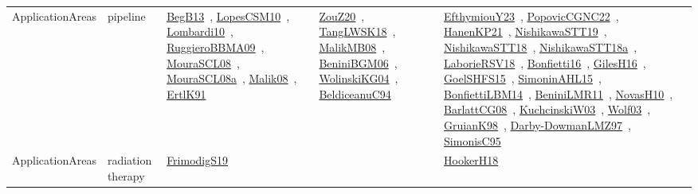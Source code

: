 {\begin{longtable}{lp{3cm}>{\raggedright\arraybackslash}p{6cm}>{\raggedright\arraybackslash}p{6cm}>{\raggedright\arraybackslash}p{8cm}}
ApplicationAreas & pipeline & \href{works/BegB13.pdf}{BegB13}~\cite{BegB13}, \href{works/LopesCSM10.pdf}{LopesCSM10}~\cite{LopesCSM10}, \href{works/Lombardi10.pdf}{Lombardi10}~\cite{Lombardi10}, \href{works/RuggieroBBMA09.pdf}{RuggieroBBMA09}~\cite{RuggieroBBMA09}, \href{works/MouraSCL08.pdf}{MouraSCL08}~\cite{MouraSCL08}, \href{works/MouraSCL08a.pdf}{MouraSCL08a}~\cite{MouraSCL08a}, \href{works/Malik08.pdf}{Malik08}~\cite{Malik08}, \href{works/ErtlK91.pdf}{ErtlK91}~\cite{ErtlK91} & \href{works/ZouZ20.pdf}{ZouZ20}~\cite{ZouZ20}, \href{works/TangLWSK18.pdf}{TangLWSK18}~\cite{TangLWSK18}, \href{works/MalikMB08.pdf}{MalikMB08}~\cite{MalikMB08}, \href{works/BeniniBGM06.pdf}{BeniniBGM06}~\cite{BeniniBGM06}, \href{works/WolinskiKG04.pdf}{WolinskiKG04}~\cite{WolinskiKG04}, \href{works/BeldiceanuC94.pdf}{BeldiceanuC94}~\cite{BeldiceanuC94} & \href{works/EfthymiouY23.pdf}{EfthymiouY23}~\cite{EfthymiouY23}, \href{works/PopovicCGNC22.pdf}{PopovicCGNC22}~\cite{PopovicCGNC22}, \href{works/HanenKP21.pdf}{HanenKP21}~\cite{HanenKP21}, \href{works/NishikawaSTT19.pdf}{NishikawaSTT19}~\cite{NishikawaSTT19}, \href{works/NishikawaSTT18.pdf}{NishikawaSTT18}~\cite{NishikawaSTT18}, \href{works/NishikawaSTT18a.pdf}{NishikawaSTT18a}~\cite{NishikawaSTT18a}, \href{works/LaborieRSV18.pdf}{LaborieRSV18}~\cite{LaborieRSV18}, \href{works/Bonfietti16.pdf}{Bonfietti16}~\cite{Bonfietti16}, \href{works/GilesH16.pdf}{GilesH16}~\cite{GilesH16}, \href{works/GoelSHFS15.pdf}{GoelSHFS15}~\cite{GoelSHFS15}, \href{works/SimoninAHL15.pdf}{SimoninAHL15}~\cite{SimoninAHL15}, \href{works/BonfiettiLBM14.pdf}{BonfiettiLBM14}~\cite{BonfiettiLBM14}, \href{works/BeniniLMR11.pdf}{BeniniLMR11}~\cite{BeniniLMR11}, \href{works/NovasH10.pdf}{NovasH10}~\cite{NovasH10}, \href{works/BarlattCG08.pdf}{BarlattCG08}~\cite{BarlattCG08}, \href{works/KuchcinskiW03.pdf}{KuchcinskiW03}~\cite{KuchcinskiW03}, \href{works/Wolf03.pdf}{Wolf03}~\cite{Wolf03}, \href{works/GruianK98.pdf}{GruianK98}~\cite{GruianK98}, \href{works/Darby-DowmanLMZ97.pdf}{Darby-DowmanLMZ97}~\cite{Darby-DowmanLMZ97}, \href{works/SimonisC95.pdf}{SimonisC95}~\cite{SimonisC95}\\
ApplicationAreas & radiation therapy & \href{works/FrimodigS19.pdf}{FrimodigS19}~\cite{FrimodigS19} &  & \href{works/HookerH18.pdf}{HookerH18}~\cite{HookerH18}\\

\end{longtable}}
